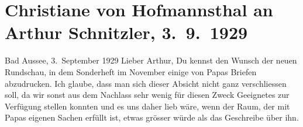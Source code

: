 

         
         \renewcommand{\erwaehntePersonen}{Personen: Hugo von Hofmannsthal, Rudolf Kayser}
         \renewcommand{\erwaehnteInstitutionen}{Institutionen: Neue Rundschau, Neue Deutsche Rundschau, Freie Bühne}
         \renewcommand{\erwaehnteOrte}{Orte: Bad Aussee, Wien}
         \renewcommand{\erwaehnteWerke}{Werke: Aus dem Nachlass}
               \section[Christiane von Hofmannsthal an Arthur Schnitzler, 3. 9. 1929]{ Christiane von Hofmannsthal an Arthur Schnitzler,
                    3. 9. 1929}\nopagebreak{}\rehead{ }\begin{ledgroupsized}[t]{13cm}\normalsize\beginnumbering \toendnotes[C]{\smallbreak\pagebreak[2]} 
\toendnotes[C]{\smallbreak}\pstart
           \raggedleft{}{\pb}Bad Aussee, 3. September 1929\pend
           \pstart{}Lieber Arthur,\pend\pstart
           Du kennst den Wunsch der neuen Rundschau, in dem
                        Sonderheft im November einige von Papas Briefen abzudrucken.
                    Ich glaube, dass man sich dieser Absicht nicht ganz verschliessen soll, da wir
                    sonst aus dem Nachlass sehr wenig für diesen Zweck Geeignetes zur Verfügung
                    stellen konnten und es uns daher lieb wäre, wenn der Raum, der mit Papas eigenen Sachen
                    erfüllt ist, etwas grösser würde als das Geschreibe über ihn.\pend

\end{ledgroupsized}

